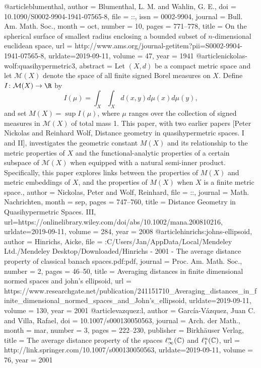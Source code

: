 @article{blumenthal,
author = {Blumenthal, L. M. and Wahlin, G. E.},
doi = {10.1090/S0002-9904-1941-07565-8},
file = {::},
issn = {0002-9904},
journal = {Bull. Am. Math. Soc.},
month = {oct},
number = {10},
pages = {771--778},
title = {{On the spherical surface of smallest radius enclosing a bounded subset of $n$-dimensional euclidean space}},
url = {http://www.ams.org/journal-getitem?pii=S0002-9904-1941-07565-8},
urldate={2019-09-11},
volume = {47},
year = {1941}
}
@article{nickolas-wolf:quasihypermetric3,
abstract = {Let $(X, d)$ be a compact metric space and let $\mathcal{M}(X)$ denote the space of all finite signed Borel measures on $X$. Define $I \colon \mathcal{M}(X) \to \R$ by \[ I(\mu) = \int_X \int_X d(x,y) d\mu(x) d\mu(y), \] and set $M(X) = \sup I(\mu)$, where $\mu$ ranges over the collection of signed measures in $\mathcal{M}(X)$ of total mass 1. This paper, with two earlier papers [Peter Nickolas and Reinhard Wolf, Distance geometry in quasihypermetric spaces. I and II], investigates the geometric constant $M(X)$ and its relationship to the metric properties of $X$ and the functional-analytic properties of a certain subspace of $\mathcal{M}(X)$ when equipped with a natural semi-inner product. Specifically, this paper explores links between the properties of $M(X)$ and metric embeddings of $X$, and the properties of $M(X)$ when $X$ is a finite metric space.},
author = {Nickolas, Peter and Wolf, Reinhard},
file = {::},
journal = {Math. Nachrichten},
month = {sep},
pages = {747--760},
title = {{Distance Geometry in Quasihypermetric Spaces. III}},
url={https://onlinelibrary.wiley.com/doi/abs/10.1002/mana.200810216},
urldate={2019-09-11},
volume = {284},
year = {2008}
}
@article{hinrichs:johns-ellipsoid,
author = {Hinrichs, Aicke},
file = {:C\:/Users/Jan/AppData/Local/Mendeley Ltd./Mendeley Desktop/Downloaded/Hinrichs - 2001 - The average distance property of classical banach spaces.pdf:pdf},
journal = {Proc. Am. Math. Soc.},
number = {2},
pages = {46--50},
title = {{Averaging distances in finite dimensional normed spaces and john's ellipsoid}},
url = {https://www.researchgate.net/publication/241151710_Averaging_distances_in_finite_dimensional_normed_spaces_and_John's_ellipsoid},
urldate={2019-09-11},
volume = {130},
year = {2001}
}
@article{vazquez:l,
author = {Garc{\'{i}}a-V{\'{a}}zquez, Juan C. and Villa, Rafael},
doi = {10.1007/s000130050563},
journal = {Arch. der Math.},
month = {mar},
number = {3},
pages = {222--230},
publisher = {Birkh{\"{a}}user Verlag},
title = {{The average distance property of the spaces $ \ell _\infty ^n ({\Bbb C}) $ and $ \ell _1^n ({\Bbb C}) $}},
url = {http://link.springer.com/10.1007/s000130050563},
urldate={2019-09-11},
volume = {76},
year = {2001}
}
